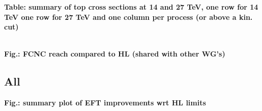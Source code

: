 \documentclass{article}
\begin{document}
{\bf Table: summary of top cross sections at 14 and 27 TeV, one row for 14 TeV one row for 27 TeV and one column per process (or above a kin. cut) }



\\
{\bf Fig.: FCNC reach compared to HL (shared with other WG's)}


\subsection{All}

{\bf Fig.: summary plot of EFT improvements wrt HL limits}


{}
\end{document}
